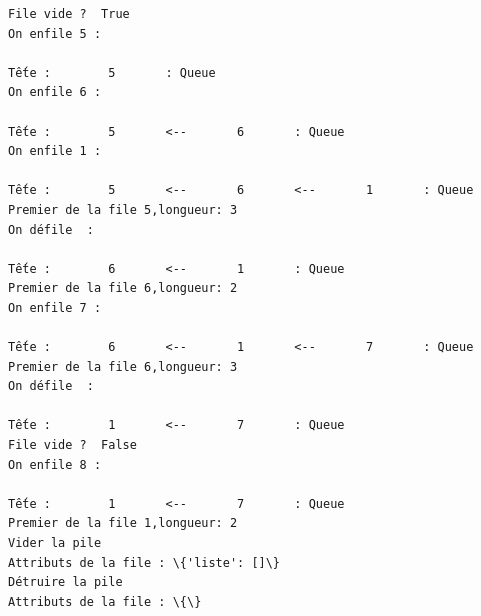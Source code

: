 \documentclass[11pt]{article}
\begin{document}
    \begin{Verbatim}[commandchars=\\\{\}]
File vide ?  True
On enfile 5 : 

Tếte :        5       : Queue
On enfile 6 : 

Tếte :        5       <--       6       : Queue
On enfile 1 : 

Tếte :        5       <--       6       <--       1       : Queue
Premier de la file 5,longueur: 3
On défile  : 

Tếte :        6       <--       1       : Queue
Premier de la file 6,longueur: 2
On enfile 7 : 

Tếte :        6       <--       1       <--       7       : Queue
Premier de la file 6,longueur: 3
On défile  : 

Tếte :        1       <--       7       : Queue
File vide ?  False
On enfile 8 : 

Tếte :        1       <--       7       : Queue
Premier de la file 1,longueur: 2
Vider la pile
Attributs de la file : \{'liste': []\}
Détruire la pile
Attributs de la file : \{\}

    \end{Verbatim}
\end{document}
